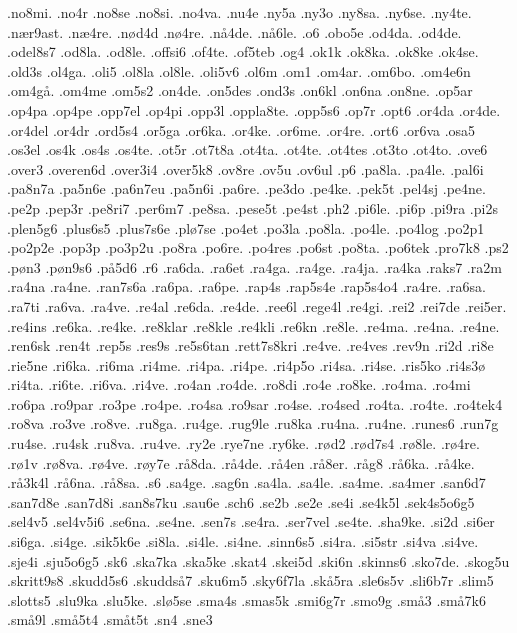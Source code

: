 {.no8mi.
.no4r
.no8se
.no8si.
.no4va.
.nu4e
.ny5a
.ny3o
.ny8sa.
.ny6se.
.ny4te.
.nær9ast.
.næ4re.
.nød4d
.nø4re.
.nå4de.
.nå6le.
.o6
.obo5e
.od4da.
.od4de.
.odel8s7
.od8la.
.od8le.
.offsi6
.of4te.
.of5teb
.og4
.ok1k
.ok8ka.
.ok8ke
.ok4se.
.old3s
.ol4ga.
.oli5
.ol8la
.ol8le.
.oli5v6
.ol6m
.om1
.om4ar.
.om6bo.
.om4e6n
.om4gå.
.om4me
.om5s2
.on4de.
.on5des
.ond3s
.on6kl
.on6na
.on8ne.
.op5ar
.op4pa
.op4pe
.opp7el
.op4pi
.opp3l
.oppla8te.
.opp5s6
.op7r
.opt6
.or4da
.or4de.
.or4del
.or4dr
.ord5s4
.or5ga
.or6ka.
.or4ke.
.or6me.
.or4re.
.ort6
.or6va
.osa5
.os3el
.os4k
.os4s
.os4te.
.ot5r
.ot7t8a
.ot4ta.
.ot4te.
.ot4tes
.ot3to
.ot4to.
.ove6
.over3
.overen6d
.over3i4
.over5k8
.ov8re
.ov5u
.ov6ul
.p6
.pa8la.
.pa4le.
.pal6i
.pa8n7a
.pa5n6e
.pa6n7eu
.pa5n6i
.pa6re.
.pe3do
.pe4ke.
.pek5t
.pel4sj
.pe4ne.
.pe2p
.pep3r
.pe8ri7
.per6m7
.pe8sa.
.pese5t
.pe4st
.ph2
.pi6le.
.pi6p
.pi9ra
.pi2s
.plen5g6
.plus6s5
.plus7s6e
.plø7se
.po4et
.po3la
.po8la.
.po4le.
.po4log
.po2p1
.po2p2e
.pop3p
.po3p2u
.po8ra
.po6re.
.po4res
.po6st
.po8ta.
.po6tek
.pro7k8
.ps2
.pøn3
.pøn9s6
.på5d6
.r6
.ra6da.
.ra6et
.ra4ga.
.ra4ge.
.ra4ja.
.ra4ka
.raks7
.ra2m
.ra4na
.ra4ne.
.ran7s6a
.ra6pa.
.ra6pe.
.rap4s
.rap5s4e
.rap5s4o4
.ra4re.
.ra6sa.
.ra7ti
.ra6va.
.ra4ve.
.re4al
.re6da.
.re4de.
.ree6l
.rege4l
.re4gi.
.rei2
.rei7de
.rei5er.
.re4ins
.re6ka.
.re4ke.
.re8klar
.re8kle
.re4kli
.re6kn
.re8le.
.re4ma.
.re4na.
.re4ne.
.ren6sk
.ren4t
.rep5s
.res9s
.re5s6tan
.rett7s8kri
.re4ve.
.re4ves
.rev9n
.ri2d
.ri8e
.rie5ne
.ri6ka.
.ri6ma
.ri4me.
.ri4pa.
.ri4pe.
.ri4p5o
.ri4sa.
.ri4se.
.ris5ko
.ri4s3ø
.ri4ta.
.ri6te.
.ri6va.
.ri4ve.
.ro4an
.ro4de.
.ro8di
.ro4e
.ro8ke.
.ro4ma.
.ro4mi
.ro6pa
.ro9par
.ro3pe
.ro4pe.
.ro4sa
.ro9sar
.ro4se.
.ro4sed
.ro4ta.
.ro4te.
.ro4tek4
.ro8va
.ro3ve
.ro8ve.
.ru8ga.
.ru4ge.
.rug9le
.ru8ka
.ru4na.
.ru4ne.
.runes6
.run7g
.ru4se.
.ru4sk
.ru8va.
.ru4ve.
.ry2e
.rye7ne
.ry6ke.
.rød2
.rød7s4
.rø8le.
.rø4re.
.rø1v
.rø8va.
.rø4ve.
.røy7e
.rå8da.
.rå4de.
.rå4en
.rå8er.
.råg8
.rå6ka.
.rå4ke.
.rå3k4l
.rå6na.
.rå8sa.
.s6
.sa4ge.
.sag6n
.sa4la.
.sa4le.
.sa4me.
.sa4mer
.san6d7
.san7d8e
.san7d8i
.san8s7ku
.sau6e
.sch6
.se2b
.se2e
.se4i
.se4k5l
.sek4s5o6g5
.sel4v5
.sel4v5i6
.se6na.
.se4ne.
.sen7s
.se4ra.
.ser7vel
.se4te.
.sha9ke.
.si2d
.si6er
.si6ga.
.si4ge.
.sik5k6e
.si8la.
.si4le.
.si4ne.
.sinn6s5
.si4ra.
.si5str
.si4va
.si4ve.
.sje4i
.sju5o6g5
.sk6
.ska7ka
.ska5ke
.skat4
.skei5d
.ski6n
.skinns6
.sko7de.
.skog5u
.skritt9s8
.skudd5s6
.skuddså7
.sku6m5
.sky6f7la
.skå5ra
.sle6s5v
.sli6b7r
.slim5
.slotts5
.slu9ka
.slu5ke.
.slø5se
.sma4s
.smas5k
.smi6g7r
.smo9g
.små3
.små7k6
.små9l
.små5t4
.småt5t
.sn4
.sne3
}
